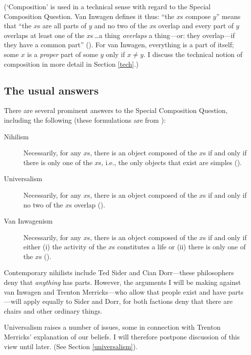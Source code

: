 \documentclass[12pt,twoside]{reedfancy}
\begin{document}
\begin{spacing}{1.25}
(`Composition' is used in a technical sense with regard to the Special
Composition Question.  Van Inwagen defines it thus: ``the $x$s compose
$y$'' means that ``the $x$s are all parts of $y$ and no two of the
$x$s overlap and every part of $y$ overlaps at least one of the
$x$s\,\ldots a thing {\em overlaps} a thing---or: they overlap---if
they have a common part'' (\citeyear[29]{inwagen1995}).  For van
Inwagen, everything is a part of itself; some $x$ is a {\em proper}
part of some $y$ only if $x \neq y$.  I discuss the technical notion
of composition in more detail in Section \ref{tech}.)

\subsection{The usual answers}
\label{scq-ans}
There are several prominent answers to the Special Composition
Question, including the following (these formulations are from
\citet{markosian1998a}):
\begin{description}
	\item[Nihilism] Necessarily, for any $x$s, there is an object
          composed of the $x$s if and only if there is only one of the
          $x$s, i.e., the only objects that exist are simples
          (\citeyear[219]{markosian1998a}).
	\item[Universalism] Necessarily, for any $x$s, there is an
          object composed of the $x$s if and only if no two of the
          $x$s overlap (\citeyear[227]{markosian1998a}).
	\item[Van Inwagenism] Necessarily, for any $x$s, there is an
          object composed of the $x$s if and only if either (i) the
          activity of the $x$s constitutes a life or (ii) there is
          only one of the $x$s (\citeyear[221]{markosian1998a}).
\end{description}

Contemporary nihilists include Ted Sider and Cian Dorr---these
philosophers deny that {\em anything} has parts.  However, the
arguments I will be making against van Inwagen and Trenton
Merricks---who allow that people exist and have parts---will apply
equally to Sider and Dorr, for both factions deny that there are
chairs and other ordinary things.

Universalism raises a number of issues, some in connection with
Trenton Merricks' explanation of our beliefs.  I will therefore
postpone discussion of this view until later.  (See Section
\ref{universalism}).


\end{spacing}
\end{document}
